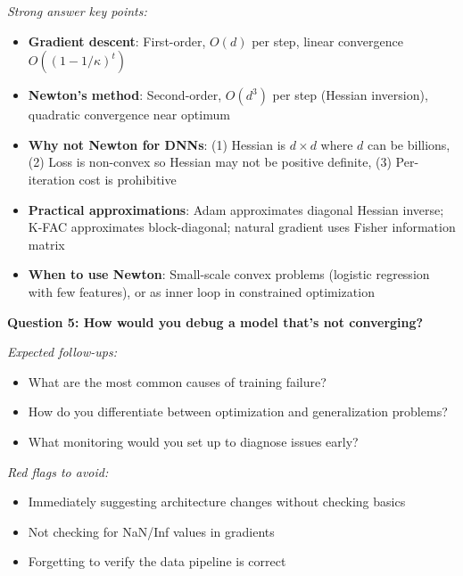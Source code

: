 \documentclass[../../main.tex]{subfiles}
\begin{document}
\begin{interviewquestions}
\textit{Strong answer key points:}
\begin{itemize}
    \item \textbf{Gradient descent}: First-order, $O(d)$ per step, linear convergence $O((1-1/\kappa)^t)$
    \item \textbf{Newton's method}: Second-order, $O(d^3)$ per step (Hessian inversion), quadratic convergence near optimum
    \item \textbf{Why not Newton for DNNs}: (1) Hessian is $d \times d$ where $d$ can be billions, (2) Loss is non-convex so Hessian may not be positive definite, (3) Per-iteration cost is prohibitive
    \item \textbf{Practical approximations}: Adam approximates diagonal Hessian inverse; K-FAC approximates block-diagonal; natural gradient uses Fisher information matrix
    \item \textbf{When to use Newton}: Small-scale convex problems (logistic regression with few features), or as inner loop in constrained optimization
\end{itemize}

\vspace{0.5em}
\textbf{Question 5: How would you debug a model that's not converging?}

\textit{Expected follow-ups:}
\begin{itemize}
    \item What are the most common causes of training failure?
    \item How do you differentiate between optimization and generalization problems?
    \item What monitoring would you set up to diagnose issues early?
\end{itemize}

\textit{Red flags to avoid:}
\begin{itemize}
    \item Immediately suggesting architecture changes without checking basics
    \item Not checking for NaN/Inf values in gradients
    \item Forgetting to verify the data pipeline is correct
\end{itemize}


\end{interviewquestions}
\end{document}
